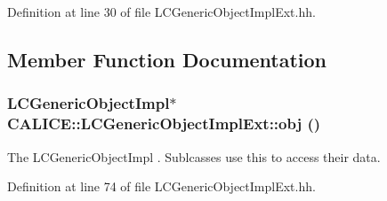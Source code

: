 Definition at line 30 of file LCGenericObjectImplExt.hh.

\subsection{Member Function Documentation}
\subsubsection[{obj}]{\setlength{\rightskip}{0pt plus 5cm}LCGenericObjectImpl$\ast$ CALICE::LCGenericObjectImplExt::obj ()\hspace{0.3cm}{\ttfamily  [inline]}}\label{classCALICE_1_1LCGenericObjectImplExt_a7a6258e61fee4d6c67481e9e58a6062d}


The LCGenericObjectImpl . Sublcasses use this to access their data. 

Definition at line 74 of file LCGenericObjectImplExt.hh.

